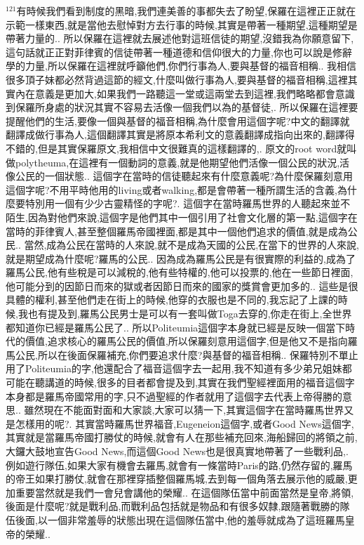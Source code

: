 \documentclass{book}
\begin{document}
$^{121}$有時候我們看到制度的黑暗,我們連美善的事都失去了盼望,保羅在這裡正正就在示範一樣東西,就是當他去慰悼對方去行事的時候,其實是帶著一種期望,這種期望是帶著力量的..
所以保羅在這裡就去展述他對這班信徒的期望,沒錯我為你願意留下,這句話就正正對菲律賓的信徒帶著一種道德和信仰很大的力量,你也可以說是修辭學的力量,所以保羅在這裡就呼籲他們,你們行事為人,要與基督的福音相稱..
我相信很多頂子妹都必然背過這節的經文,什麼叫做行事為人,要與基督的福音相稱,這裡其實內在意義是更加大,如果我們一路聽這一堂或這兩堂去到這裡,我們略略都會意識到保羅所身處的狀況其實不容易去活像一個我們以為的基督徒,.
所以保羅在這裡要提醒他們的生活,要像一個與基督的福音相稱,為什麼會用這個字呢?中文的翻譯就翻譯成做行事為人,這個翻譯其實是將原本希利文的意義翻譯成指向出來的,翻譯得不錯的,但是其實保羅原文,我相信中文很難真的這樣翻譯的,.
原文的root word就叫做polytheuma,在這裡有一個動詞的意義,就是他期望他們活像一個公民的狀況,活像公民的一個狀態..
這個字在當時的信徒聽起來有什麼意義呢?為什麼保羅刻意用這個字呢?不用平時他用的living或者walking,都是會帶著一種所謂生活的含義,為什麼要特別用一個有少少古靈精怪的字呢?.
這個字在當時羅馬世界的人聽起來並不陌生,因為對他們來說,這個字是他們其中一個引用了社會文化層的第一點,這個字在當時的菲律賓人,甚至整個羅馬帝國裡面,都是其中一個他們追求的價值,就是成為公民..
當然,成為公民在當時的人來說,就不是成為天國的公民,在當下的世界的人來說,就是期望成為什麼呢?羅馬的公民..
因為成為羅馬公民是有很實際的利益的,成為了羅馬公民,他有些稅是可以減稅的,他有些特權的,他可以投票的,他在一些節日裡面,他可能分到的因節日而來的獄或者因節日而來的國家的獎賞會更加多的..
這些是很具體的權利,甚至他們走在街上的時候,他穿的衣服也是不同的,我忘記了上課的時候,我也有提及到,羅馬公民男士是可以有一套叫做Toga去穿的,你走在街上,全世界都知道你已經是羅馬公民了..
所以Politeumia這個字本身就已經是反映一個當下時代的價值,追求核心的羅馬公民的價值,所以保羅刻意用這個字,但是他又不是指向羅馬公民,所以在後面保羅補充,你們要追求什麼?與基督的福音相稱..
保羅特別不單止用了Politeumia的字,他還配合了福音這個字去一起用,我不知道有多少弟兄姐妹都可能在聽講道的時候,很多的目者都會提及到,其實在我們聖經裡面用的福音這個字本身都是羅馬帝國常用的字,只不過聖經的作者就用了這個字去代表上帝得勝的意思..
雖然現在不能面對面和大家談,大家可以猜一下,其實這個字在當時羅馬世界又是怎樣用的呢?.
其實當時羅馬世界福音,Eugeneion這個字,或者Good News這個字,其實就是當羅馬帝國打勝仗的時候,就會有人在那些補充回來,海船歸回的將領之前,大鑼大鼓地宣告Good News,而這個Good News也是很真實地帶著了一些戰利品,.
例如遊行隊伍,如果大家有機會去羅馬,就會有一條當時Paris的路,仍然存留的,羅馬的帝王如果打勝仗,就會在那裡穿插整個羅馬城,去到每一個角落去展示他的威嚴,更加重要當然就是我們一會兒會講他的榮耀..
在這個隊伍當中前面當然是皇帝,將領,後面是什麼呢?就是戰利品,而戰利品包括就是物品和有很多奴隸,跟隨著戰勝的隊伍後面,以一個非常羞辱的狀態出現在這個隊伍當中,他的羞辱就成為了這班羅馬皇帝的榮耀..
\end{document}
